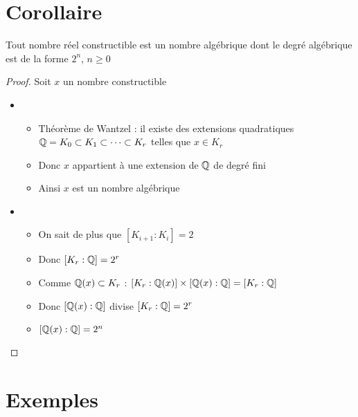 \section{Corollaire}

\begin{frame}
  \begin{corollaire}
Tout nombre réel constructible est un nombre algébrique
dont le degré algébrique est de la forme $2^n$, $n\ge 0$ 
\end{corollaire}

\pause

\begin{proof}
Soit $x$ un nombre constructible
\pause
\begin{itemize}
  \item 
  \begin{itemize}
    \item Théorème de Wantzel :
il existe des extensions quadratiques 
$\mathbb{Q} = K_0 \subset K_1 \subset \cdots \subset K_r$
telles que $x \in K_r$
\pause
    \item Donc $x$ appartient à une extension de $\mathbb{Q}$ de degré fini
\pause
    \item Ainsi $x$ est un nombre algébrique
  \end{itemize}
\pause
  \item 
  \begin{itemize}
    \item On sait de plus que $[K_{i+1}:K_i]=2$
\pause
    \item Donc $[K_r:\mathbb{Q}]=2^r$
\pause
    \item Comme $\mathbb{Q}(x) \subset K_r$ : $[K_r:\mathbb{Q}(x)] \times [\mathbb{Q}(x):\mathbb{Q}]=[K_r:\mathbb{Q}]$
\pause    
    \item Donc $[\mathbb{Q}(x):\mathbb{Q}]$ divise $[K_r:\mathbb{Q}]=2^r$
\pause    
    \item $[\mathbb{Q}(x):\mathbb{Q}]=2^n$ \qedhere
  \end{itemize}
 
\end{itemize}
\end{proof}

\end{frame}



\section{Exemples}

